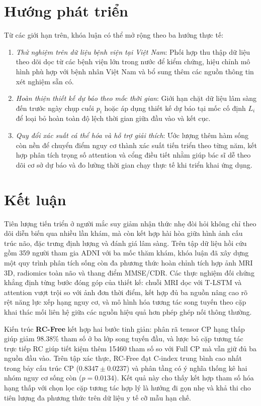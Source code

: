 \section{Hướng phát triển}
Từ các giới hạn trên, khóa luận có thể mở rộng theo ba hướng thực tế:
\begin{enumerate}[itemsep=0.15em,topsep=0.25em]
\item \emph{Thử nghiệm trên dữ liệu bệnh viện tại Việt Nam}: Phối hợp thu thập dữ liệu theo dõi dọc từ các bệnh viện lớn trong nước để kiểm chứng, hiệu chỉnh mô hình phù hợp với bệnh nhân Việt Nam và bổ sung thêm các nguồn thông tin xét nghiệm sẵn có.
\item \emph{Hoàn thiện thiết kế dự báo theo mốc thời gian}: Giới hạn chặt dữ liệu lâm sàng đến trước ngày chụp cuối $p_i$ hoặc áp dụng thiết kế dự báo tại mốc cố định $L_i$ \cite{vanhouwelingen2007dynamic} để loại bỏ hoàn toàn độ lệch thời gian giữa đầu vào và kết cục.
\item \emph{Quy đổi xác suất cá thể hóa và hỗ trợ giải thích}: Ước lượng thêm hàm sống còn nền \cite{kvamme2019time} để chuyển điểm nguy cơ thành xác suất tiến triển theo từng năm, kết hợp phân tích trọng số attention và cổng điều tiết nhằm giúp bác sĩ dễ theo dõi cơ sở dự báo và đo lường thời gian chạy thực tế khi triển khai ứng dụng.
\end{enumerate}

\section{Kết luận}
Tiên lượng tiến triển ở người mắc suy giảm nhận thức nhẹ đòi hỏi không chỉ theo dõi diễn biến qua nhiều lần khám, mà còn kết hợp hài hòa giữa hình ảnh cấu trúc não, đặc trưng định lượng và đánh giá lâm sàng. Trên tập dữ liệu hồi cứu gồm 359 người tham gia ADNI với ba mốc thăm khám, khóa luận đã xây dựng một quy trình phân tích sống còn đa phương thức hoàn chỉnh tích hợp ảnh MRI 3D, radiomics toàn não và thang điểm MMSE/CDR. Các thực nghiệm đối chứng khẳng định từng bước đóng góp của thiết kế: chuỗi MRI dọc với T-LSTM và attention vượt trội so với ảnh đơn thời điểm, kết hợp đủ ba nguồn nâng cao rõ rệt năng lực xếp hạng nguy cơ, và mô hình hóa tương tác song tuyến theo cặp khai thác mối liên hệ giữa các nguồn hiệu quả hơn phép ghép nối thông thường.

Kiến trúc \textbf{RC-Free} kết hợp hai bước tinh giản: phân rã tensor CP hạng thấp giúp giảm 98.38\% tham số ở ba lớp song tuyến đầu, và lược bỏ cặp tương tác trực tiếp RC giúp tiết kiệm thêm 15460 tham số so với Full CP mà vẫn giữ đủ ba nguồn đầu vào. Trên tập xác thực, RC-Free đạt C-index trung bình cao nhất trong bảy cấu trúc CP ($0.8347\pm0.0237$) và phân tầng có ý nghĩa thống kê hai nhóm nguy cơ sống còn ($p=0.0134$). Kết quả này cho thấy kết hợp tham số hóa hạng thấp với chọn lọc cặp tương tác hợp lý là hướng đi gọn nhẹ và khả thi cho tiên lượng đa phương thức trên dữ liệu y tế cỡ mẫu hạn chế.
